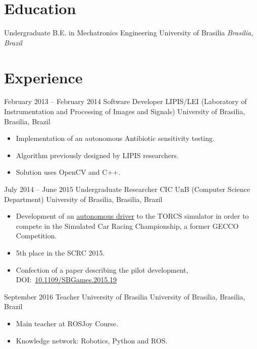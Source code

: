 \documentclass[a4paper, 10pt]{moderncv}        %
\begin{document}
\makecvtitle
\section{Education}
\cventry
{Undergraduate}
{B.E. in Mechatronics Engineering}
{University of Brasilia}
{}
{\textit{Brasilia, Brazil}}
{}
\section{Experience}
\cventry
{February 2013 -- February 2014}
{Software Developer}
{LIPIS/LEI (Laboratory of Instrumentation and Processing of Images and Signals)}
{University of Brasilia, Brasilia, Brazil}
{}
{\begin{itemize}%
    \item Implementation of an autonomous Antibiotic sensitivity testing.
    \item Algorithm previously designed by LIPIS researchers.
    \item Solution uses OpenCV and C++.
    \end{itemize}}
\cventry
{July 2014 -- June 2015}
{Undergraduate Researcher}
{CIC UnB (Computer Science Department)}
{University of Brasilia, Brasilia, Brazil}
{}
{\begin{itemize}%
    \item Development of an \href{https://github.com/bruno147/driver-ga}{autonomous driver} to the TORCS simulator in order to compete in the Simulated Car Racing Championship, a former GECCO Competition.
    \item 5th place in the SCRC 2015.
    \item Confection of a paper describing the pilot development, DOI:~\href{https://doi.org/10.1109/SBGames.2015.19}{10.1109/SBGames.2015.19}
    \end{itemize}}
\cventry
{September 2016}
{Teacher}
{University of Brasilia}
{University of Brasilia, Brasilia, Brazil}
{}
{\begin{itemize}%
    \item Main teacher at ROSJoy Course.
    \item Knowledge network: Robotics, Python and ROS.
    \end{itemize}}
\end{document}
